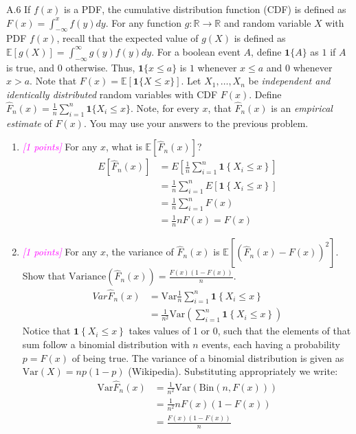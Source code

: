 \documentclass{article}
\newcommand{\field}[1]{\mathbb{#1}}
\newcommand{\1}{\mathbf{1}}
\newcommand{\E}{\mathbb{E}}
\newcommand{\R}{\field{R}} %
\newcommand{\points}[1]{\small\textcolor{magenta}{\emph{[#1 points]}} \normalsize}
\begin{document}
\newpage
A.6 If $f(x)$ is a PDF, the cumulative distribution function (CDF) is  defined as $F(x) = \int_{-\infty}^x f(y) dy$.  For any function $g : \R \rightarrow \R$ and random variable $X$ with PDF $f(x)$, recall that the expected value of $g(X)$ is defined as $\E[g(X)] = \int_{-\infty}^\infty g(y) f(y) dy$. For a boolean event $A$, define $\1\{ A \}$ as $1$ if $A$ is true, and $0$ otherwise. Thus, $\1\{ x \leq a \}$ is $1$ whenever $x \leq a$ and
  $0$ whenever $x > a$.  Note that $F(x) = \E[\1\{X \leq x\}]$.  Let $X_1,\dots,X_n$ be \emph{independent and identically distributed} random variables with CDF $F(x)$.  Define $\widehat{F}_n(x) = \frac{1}{n} \sum_{i=1}^n \1\{X_i \leq x\}$. Note, for every $x$, that $\widehat{F}_n(x)$ is an \emph{empirical estimate} of  $F(x)$. You may use your answers to the previous problem. 
  \begin{enumerate}
  
  \item \points{1} For any $x$, what is $\E[ \widehat{F}_n(x) ]$?
  \begin{align*}
      E[\hat F_n(x)] &= E\left[ \frac{1}{n}\sum_{i=1}^n \mathbf{1} \left\{ X_i \leq x \right\} \right] \\
      &= \frac{1}{n}\sum_{i=1}^n E\left[\mathbf{1} \left\{ X_i \leq x \right\} \right] \\
      &= \frac{1}{n}\sum_{i=1}^n F(x) \\
      &= \frac{1}{n} n F(x) = F(x)
  \end{align*}  
  
  \item \points{1} For any $x$, the variance of $\widehat{F}_n(x)$ is $\E[ ( \widehat{F}_n(x) - F(x) )^2 ]$. Show that $\textrm{Variance}(\widehat{F}_n(x)) = \frac{F(x)(1-F(x))}{n}$. \\
  \begin{align*}
  {Var}\hat F_n(x) &= \text{Var} \frac{1}{n}\sum_{i=1}^n \mathbf{1} \left\{ X_i \leq x \right\} \\
      &= \frac{1}{n^2}\text{Var}\left(\sum_{i=1}^n \mathbf{1} \left\{ X_i \leq x \right\}\right)
  \end{align*}  
  Notice that $\mathbf{1}\left\{X_i\leq x\right\}$ takes values of 1 or 0, such that the elements of that sum follow a binomial distribution with $n$ events, each having a probability $p=F(x)$ of being true. The variance of a binomial distribution is given as $\text{Var}(X)=np(1-p)$ (Wikipedia). Substituting appropriately we write: 
  \begin{align*}
  \text{Var}\hat F_n(x) &= \frac{1}{n^2}\text{Var}(\text{Bin}(n, F(x))) \\
  &= \frac{1}{n^2}nF(x)\left(1-F(x)\right) \\
  &= \frac{F(x)\left(1-F(x)\right)}{n} 
  \end{align*} 
  

\end{enumerate}
\end{document}
